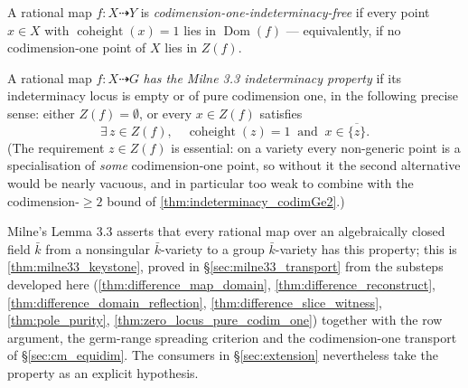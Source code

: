 \begin{definition}
  \label{def:codim_one_free}
  \leanok
  A rational map \(f : X \dashrightarrow Y\) is
  \emph{codimension-one-indeterminacy-free} if every point \(x \in X\) with
  \(\operatorname{coheight}(x) = 1\) lies in \(\operatorname{Dom}(f)\) ---
  equivalently, if no codimension-one point of \(X\) lies in \(Z(f)\).
\end{definition}

\begin{definition}
  \label{def:milne33_indeterminacy}
  \leanok
  A rational map \(f : X \dashrightarrow G\) \emph{has the Milne 3.3
  indeterminacy property} if its indeterminacy locus is empty or of pure
  codimension one, in the following precise sense: either
  \(Z(f) = \emptyset\), or every \(x \in Z(f)\) satisfies
  \[
    \exists\, z \in Z(f), \quad \operatorname{coheight}(z) = 1
    \ \text{ and }\ x \in \overline{\{z\}} .
  \]
  (The requirement \(z \in Z(f)\) is essential: on a variety every non-generic
  point is a specialisation of \emph{some} codimension-one point, so without it
  the second alternative would be nearly vacuous, and in particular too weak to
  combine with the codimension-\(\geq 2\) bound of
  \ref{thm:indeterminacy_codimGe2}.)

  Milne's Lemma 3.3 asserts that every rational map over an algebraically
  closed field \(\bar k\) from a nonsingular \(\bar k\)-variety to a group
  \(\bar k\)-variety has this property; this is \ref{thm:milne33_keystone},
  proved in \S\ref{sec:milne33_transport} from the substeps developed here
  (\ref{thm:difference_map_domain}, \ref{thm:difference_reconstruct},
  \ref{thm:difference_domain_reflection}, \ref{thm:difference_slice_witness},
  \ref{thm:pole_purity}, \ref{thm:zero_locus_pure_codim_one}) together with the
  row argument, the germ-range spreading criterion and the codimension-one
  transport of \S\ref{sec:cm_equidim}. The consumers in \S\ref{sec:extension}
  nevertheless take the property as an explicit hypothesis.
\end{definition}

